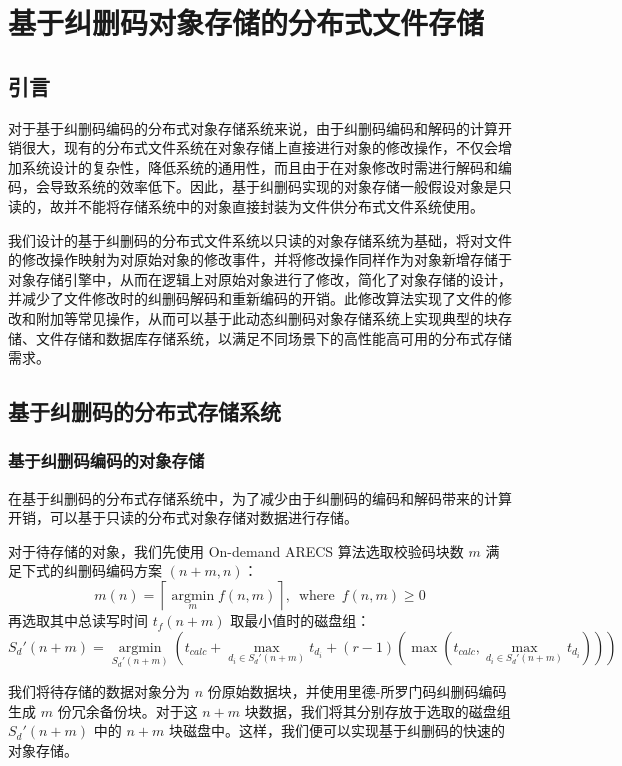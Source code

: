 \chapter{基于纠删码对象存储的分布式文件存储}
\section{引言}
对于基于纠删码编码的分布式对象存储系统来说，由于纠删码编码和解码的计算开销很大，现有的分布式文件系统在对象存储上直接进行对象的修改操作，不仅会增加系统设计的复杂性，降低系统的通用性，而且由于在对象修改时需进行解码和编码，会导致系统的效率低下。因此，基于纠删码实现的对象存储一般假设对象是只读的，故并不能将存储系统中的对象直接封装为文件供分布式文件系统使用。

我们设计的基于纠删码的分布式文件系统以只读的对象存储系统为基础，将对文件的修改操作映射为对原始对象的修改事件，并将修改操作同样作为对象新增存储于对象存储引擎中，从而在逻辑上对原始对象进行了修改，简化了对象存储的设计，并减少了文件修改时的纠删码解码和重新编码的开销。此修改算法实现了文件的修改和附加等常见操作，从而可以基于此动态纠删码对象存储系统上实现典型的块存储、文件存储和数据库存储系统，以满足不同场景下的高性能高可用的分布式存储需求。
\section{基于纠删码的分布式存储系统}
\subsection{基于纠删码编码的对象存储}
在基于纠删码的分布式存储系统中，为了减少由于纠删码的编码和解码带来的计算开销，可以基于只读的分布式对象存储对数据进行存储。

对于待存储的对象，我们先使用 On-demand ARECS 算法选取校验码块数 $m$ 满足下式的纠删码编码方案 $(n+m,n)$：
\begin{equation}
m(n)=\left\lceil\operatorname*{argmin}_{m}f(n,m)\right\rceil,\ \operatorname*{where}\ f(n,m) \geq 0
\end{equation}
再选取其中总读写时间 $t_{f}(n+m)$ 取最小值时的磁盘组：
\begin{equation}
S_{d}'(n+m)=\operatorname*{argmin}_{S_{d}'(n+m)}\left(t_{calc}+\max_{d_{i}{\in}S_{d}'(n+m)}t_{d_i}+(r-1)\left(\max\left(t_{calc},\max_{d_{i}{\in}S_{d}'(n+m)}t_{d_i}\right)\right)\right)
\end{equation}

我们将待存储的数据对象分为 $n$ 份原始数据块，并使用里德-所罗门码纠删码编码生成 $m$ 份冗余备份块。对于这 $n+m$ 块数据，我们将其分别存放于选取的磁盘组 $S_{d}'(n+m)$ 中的 $n+m$ 块磁盘中。这样，我们便可以实现基于纠删码的快速的对象存储。

